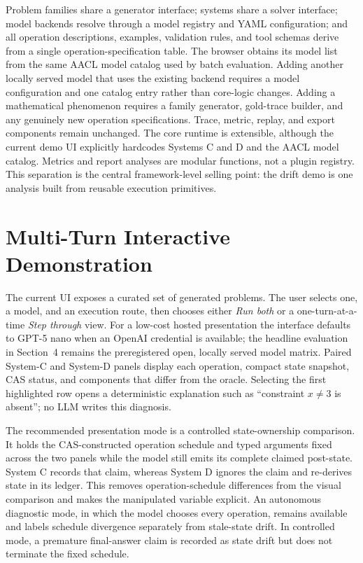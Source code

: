\documentclass[11pt]{article}
\begin{document}
Problem families share a generator interface; systems share a solver interface;
model backends resolve through a model registry and YAML configuration; and all
operation descriptions, examples, validation rules, and tool schemas derive from a
single operation-specification table.  The browser obtains its model list from the
same AACL model catalog used by batch evaluation.  Adding another locally served
model that uses the existing backend requires a model configuration and one catalog
entry rather than core-logic changes.  Adding a mathematical
phenomenon requires a family generator, gold-trace builder, and any genuinely new
operation specifications.  Trace, metric, replay, and export components remain
unchanged.  The core runtime is extensible, although the current demo UI explicitly
hardcodes Systems C and D and the AACL model catalog.  Metrics and report analyses
are modular functions, not a plugin registry.  This separation is the central
framework-level selling point: the drift demo is one analysis built from reusable
execution primitives.

\section{Multi-Turn Interactive Demonstration}

The current UI exposes a curated set of generated problems.  The user selects one,
a model, and an execution route, then chooses either \emph{Run both} or a
one-turn-at-a-time \emph{Step through} view.  For a low-cost hosted presentation the
interface defaults to GPT-5 nano when an OpenAI credential is available; the
headline evaluation in Section~4 remains the preregistered open, locally served
model matrix.  Paired System-C and System-D panels display each operation, compact
state snapshot, CAS status, and components that differ from the oracle.  Selecting
the first highlighted row opens a deterministic explanation such as ``constraint
$x\neq 3$ is absent''; no LLM writes this diagnosis.

The recommended presentation mode is a controlled state-ownership comparison.  It
holds the CAS-constructed operation schedule and typed arguments fixed across the
two panels while the model still emits its complete claimed post-state.  System C
records that claim, whereas System D ignores the claim and re-derives state in its
ledger.  This removes operation-schedule differences from the visual comparison and
makes the manipulated variable explicit.  An autonomous diagnostic mode, in which
the model chooses every operation, remains available and labels schedule divergence
separately from stale-state drift.  In controlled mode, a premature final-answer
claim is recorded as state drift but does not terminate the fixed schedule.
\end{document}
